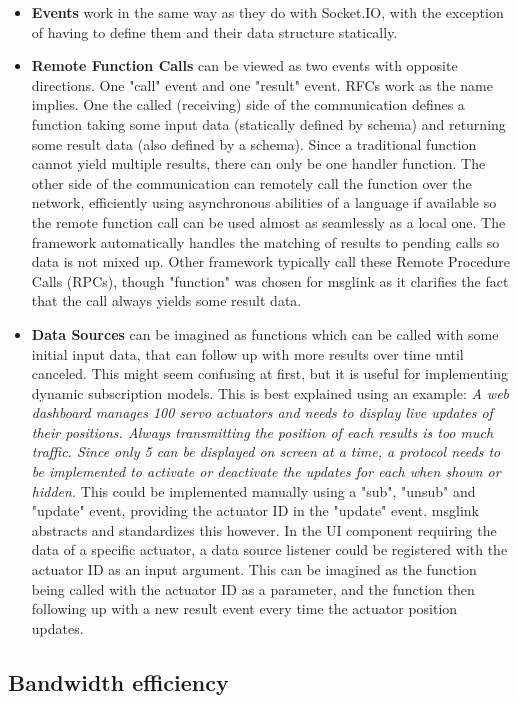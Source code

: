 \documentclass[conference]{IEEEtran}
\begin{document}
\begin{itemize}
    \item \textbf{Events} work in the same way as they do with Socket.IO, with the exception of having to define them and their data structure statically.
    \item \textbf{Remote Function Calls} can be viewed as two events with opposite directions. One "call" event and one "result" event. RFCs work as the name implies. One the called (receiving) side of the communication defines a function taking some input data (statically defined by schema) and returning some result data (also defined by a schema). Since a traditional function cannot yield multiple results, there can only be one handler function. The other side of the communication can remotely call the function over the network, efficiently using asynchronous abilities of a language if available so the remote function call can be used almost as seamlessly as a local one. The framework automatically handles the matching of results to pending calls so data is not mixed up. Other framework typically call these Remote Procedure Calls (RPCs), though "function" was chosen for msglink as it clarifies the fact that the call always yields some result data.
    \item \textbf{Data Sources} can be imagined as functions which can be called with some initial input data, that can follow up with more results over time until canceled. This might seem confusing at first, but it is useful for implementing dynamic subscription models. This is best explained using an example: \textit{A web dashboard manages 100 servo actuators and needs to display live updates of their positions. Always transmitting the position of each results is too much traffic. Since only 5 can be displayed on screen at a time, a protocol needs to be implemented to activate or deactivate the updates for each when shown or hidden.} This could be implemented manually using a "sub", "unsub" and "update" event, providing the actuator ID in the "update" event. msglink abstracts and standardizes this however. In the UI component requiring the data of a specific actuator, a data source listener could be registered with the actuator ID as an input argument. This can be imagined as the function being called with the actuator ID as a parameter, and the function then following up with a new result event every time the actuator position updates.
\end{itemize}


\subsection{Bandwidth efficiency}
\end{document}
